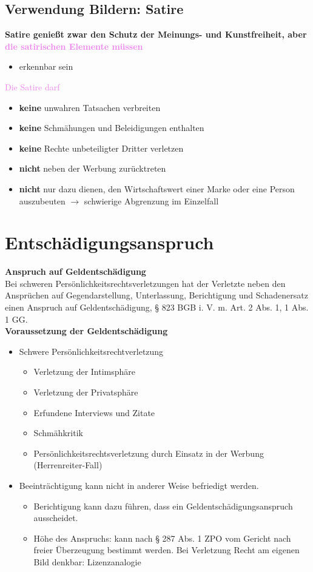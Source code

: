 \subsection{Verwendung Bildern: Satire}
\textbf{Satire genießt zwar den Schutz der Meinungs- und Kunstfreiheit, aber \textcolor{violet}{die satirischen Elemente müssen}}
\begin{itemize}
    \item erkennbar sein
\end{itemize}
\textcolor{violet}{Die Satire darf}
\begin{itemize}
    \item \textbf{keine} unwahren Tatsachen verbreiten
    \item \textbf{keine} Schmähungen und Beleidigungen enthalten
    \item \textbf{keine} Rechte unbeteiligter Dritter verletzen 
    \item \textbf{nicht} neben der Werbung zurücktreten
    \item \textbf{nicht} nur dazu dienen, den Wirtschaftswert einer Marke oder eine Person auszubeuten $\rightarrow$ schwierige Abgrenzung im Einzelfall
\end{itemize}
\section{Entschädigungsanspruch}
\textbf{Anspruch auf Geldentschädigung}\\
Bei schweren Persönlichkeitsrechtsverletzungen hat der Verletzte neben den Ansprüchen auf Gegendarstellung, Unterlassung, Berichtigung und Schadenersatz einen Anspruch auf Geldentschädigung, § 823 BGB i. V. m. Art. 2 Abs. 1, 1 Abs. 1 GG.\\
\textbf{Voraussetzung der Geldentschädigung}\\
\begin{itemize}
    \item Schwere Persönlichkeitsrechtverletzung
    \begin{itemize}
        \item Verletzung der Intimsphäre
        \item Verletzung der Privatsphäre
        \item Erfundene Interviews und Zitate
        \item Schmähkritik
        \item Persönlichkeitsrechtsverletzung durch Einsatz in der Werbung (Herrenreiter-Fall)
    \end{itemize}
    \item Beeinträchtigung kann nicht in anderer Weise befriedigt werden.
    \begin{itemize}
        \item Berichtigung kann dazu führen, dass ein Geldentschädigungsanspruch ausscheidet.
        \item Höhe des Anspruchs: kann nach § 287 Abs. 1 ZPO vom Gericht \glqq{}nach freier Überzeugung\grqq{} bestimmt werden. Bei Verletzung Recht am eigenen Bild denkbar: Lizenzanalogie
    \end{itemize}
\end{itemize}
